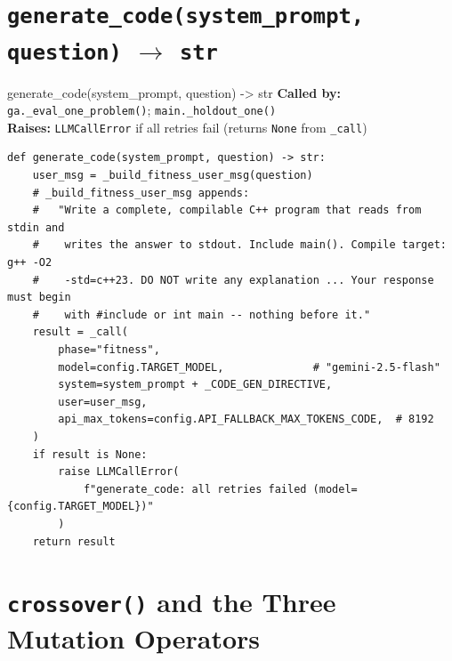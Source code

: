\documentclass[11pt,a4paper]{report}
\newcommand{\fn}[1]{\texttt{#1}}
\begin{document}
\section{\fn{generate\_code(system\_prompt, question)} $\to$ \fn{str}}

\begin{specbox}{generate\_code(system\_prompt, question) -> str}
\textbf{Called by:} \fn{ga.\_eval\_one\_problem()}; \fn{main.\_holdout\_one()}\\
\textbf{Raises:} \fn{LLMCallError} if all retries fail (returns \fn{None} from \fn{\_call})
\end{specbox}

\begin{lstlisting}[style=example]
def generate_code(system_prompt, question) -> str:
    user_msg = _build_fitness_user_msg(question)
    # _build_fitness_user_msg appends:
    #   "Write a complete, compilable C++ program that reads from stdin and
    #    writes the answer to stdout. Include main(). Compile target: g++ -O2
    #    -std=c++23. DO NOT write any explanation ... Your response must begin
    #    with #include or int main -- nothing before it."
    result = _call(
        phase="fitness",
        model=config.TARGET_MODEL,              # "gemini-2.5-flash"
        system=system_prompt + _CODE_GEN_DIRECTIVE,
        user=user_msg,
        api_max_tokens=config.API_FALLBACK_MAX_TOKENS_CODE,  # 8192
    )
    if result is None:
        raise LLMCallError(
            f"generate_code: all retries failed (model={config.TARGET_MODEL})"
        )
    return result
\end{lstlisting}

\section{\fn{crossover()} and the Three Mutation Operators}
\end{document}
